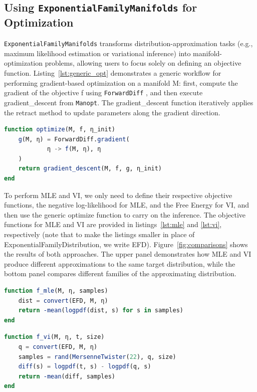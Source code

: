 \documentclass{juliacon}
\newcommand{\dmitry}[2][] {\todo[inline,backgroundcolor=teal!20!white, #1]{(dmitry) #2}}
\newcommand{\code}[1]{\textsf{#1}}
\begin{document}
\subsection{Using \texttt{ExponentialFamilyManifolds} for Optimization} \label{sec:using_efm}

\texttt{ExponentialFamilyManifolds} transforms distribution-approximation tasks 
(e.g., maximum likelihood estimation or variational inference) into manifold-optimization problems, 
allowing users to focus solely on defining an objective function. 
Listing~\ref{lst:generic_opt} demonstrates a generic workflow for performing gradient-based optimization on a manifold \code{M}: 
first, compute the gradient of the objective \code{f} using \texttt{ForwardDiff} \cite{revels_forward-mode_2016}, 
and then execute \code{gradient\_descent} from \texttt{Manopt}. 
The \code{gradient\_descent} function iteratively applies the \code{retract} method to update parameters along the gradient direction.
\begin{lstlisting}[language=Julia, caption={Generic manifold-based optimization}, label={lst:generic_opt}]
function optimize(M, f, η_init)
    g(M, η) = ForwardDiff.gradient(
            η -> f(M, η), η
    )
    return gradient_descent(M, f, g, η_init)
end
\end{lstlisting}

To perform MLE and VI, we only need to define their respective objective functions, the negative log-likelihood for MLE, and the Free Energy for VI, and then use the generic \code{optimize} function to carry on the inference. The objective functions for MLE and VI are provided in listings~\ref{lst:mle} and \ref{lst:vi}, respectively (note that to make the listings smaller in place of \code{ExponentialFamilyDistribution}, we write \code{EFD}). Figure~\ref{fig:comparisons} shows the results of both approaches. The upper panel demonstrates how MLE and VI produce different approximations to the same target distribution, while the bottom panel compares different families of the approximating distribution.

\begin{lstlisting}[language=Julia, caption={Objective functions for MLE}, label={lst:mle}]
function f_mle(M, η, samples)
    dist = convert(EFD, M, η)
    return -mean(logpdf(dist, s) for s in samples)
end
\end{lstlisting}

\begin{lstlisting}[language=Julia, caption={Objective functions for VI}, label={lst:vi}]
function f_vi(M, η, t, size)
    q = convert(EFD, M, η)
    samples = rand(MersenneTwister(22), q, size)
    diff(s) = logpdf(t, s) - logpdf(q, s)
    return -mean(diff, samples)
end
\end{lstlisting}
\end{document}
